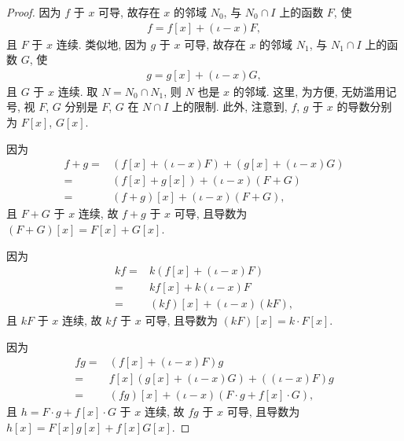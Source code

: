 \begin{proof}
    因为 $f$ 于 $x$ 可导,
    故存在 $x$ 的邻域 $N_0$, 与 $N_0 \cap I$ 上的函数 $F$,
    使
    \begin{align*}
        f = f[x] + (\iota - x)F,
    \end{align*}
    且 $F$ 于 $x$ 连续.
    类似地,
    因为 $g$ 于 $x$ 可导,
    故存在 $x$ 的邻域 $N_1$, 与 $N_1 \cap I$ 上的函数 $G$,
    使
    \begin{align*}
        g = g[x] + (\iota - x)G,
    \end{align*}
    且 $G$ 于 $x$ 连续.
    取 $N = N_0 \cap N_1$, 则 $N$ 也是 $x$ 的邻域.
    这里, 为方便, 无妨滥用记号,
    视 $F$, $G$ 分别是 $F$, $G$ 在 $N \cap I$ 上的限制.
    此外, 注意到,
    $f$, $g$ 于 $x$ 的导数分别为 $F[x]$, $G[x]$.

    因为
    \begin{align*}
        f + g
        = {} & (f[x] + (\iota - x)F) + (g[x] + (\iota - x)G) \\
        = {} & (f[x] + g[x]) + (\iota - x)(F + G)            \\
        = {} & (f + g)[x] + (\iota - x)(F + G),
    \end{align*}
    且 $F + G$ 于 $x$ 连续,
    故 $f + g$ 于 $x$ 可导,
    且导数为 $(F + G)[x] = F[x] + G[x]$.

    因为
    \begin{align*}
        kf
        = {} & k(f[x] + (\iota - x)F)     \\
        = {} & kf[x] + k(\iota - x)F      \\
        = {} & (kf)[x] + (\iota - x)(kF),
    \end{align*}
    且 $kF$ 于 $x$ 连续,
    故 $kf$ 于 $x$ 可导,
    且导数为 $(kF)[x] = k \cdot F[x]$.

    因为
    \begin{align*}
        fg
        = {} & (f[x] + (\iota - x)F)g                           \\
        = {} & f[x] (g[x] + (\iota - x)G) + ((\iota - x)F)g     \\
        = {} & (fg)[x] + (\iota - x)(F \cdot g + f[x] \cdot G),
    \end{align*}
    且
    $h = F \cdot g + f[x] \cdot G$
    于 $x$ 连续,
    故 $fg$ 于 $x$ 可导,
    且导数为 $h[x] = F[x]g[x] + f[x]G[x]$.


\end{proof}
